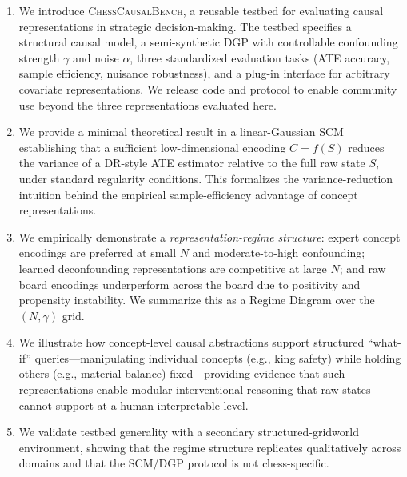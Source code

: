 \documentclass{article}
\begin{document}
\begin{enumerate}
\item We introduce \textsc{ChessCausalBench}, a reusable testbed for evaluating
causal representations in strategic decision-making. The testbed specifies a
structural causal model, a semi-synthetic DGP with controllable confounding strength
$\gamma$ and noise $\alpha$, three standardized evaluation tasks (ATE accuracy,
sample efficiency, nuisance robustness), and a plug-in interface for arbitrary
covariate representations. We release code and protocol to enable community use
beyond the three representations evaluated here.\cite{pearl2009causality,lemeire2005causalmodelsinchess}

\item We provide a minimal theoretical result in a linear-Gaussian SCM establishing
that a sufficient low-dimensional encoding $C = f(S)$ reduces the variance of a
DR-style ATE estimator relative to the full raw state $S$, under standard regularity
conditions. This formalizes the variance-reduction intuition behind the empirical
sample-efficiency advantage of concept representations.\cite{chernozhukov2018double}

\item We empirically demonstrate a \emph{representation-regime structure}: expert
concept encodings are preferred at small $N$ and moderate-to-high confounding;
learned deconfounding representations are competitive at large $N$; and raw board
encodings underperform across the board due to positivity and propensity instability.
We summarize this as a Regime Diagram over the $(N, \gamma)$
grid.\cite{chernozhukov2018double,kuang2020information,scholkopf2021towards}

\item We illustrate how concept-level causal abstractions support structured
``what-if'' queries---manipulating individual concepts (e.g., king safety) while
holding others (e.g., material balance) fixed---providing evidence that such
representations enable modular interventional reasoning that raw states cannot
support at a human-interpretable level.\cite{lemeire2005causalmodelsinchess,fortressesPaper,causalMaskingSpatial}

\item We validate testbed generality with a secondary structured-gridworld
environment, showing that the regime structure replicates qualitatively across
domains and that the SCM/DGP protocol is not chess-specific.
\end{enumerate}
\end{document}
